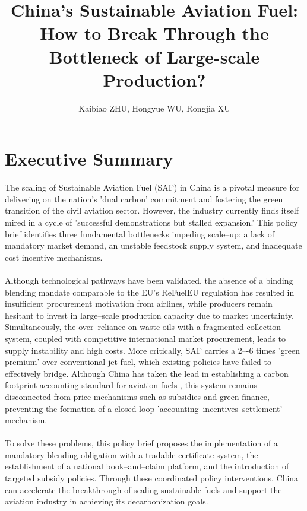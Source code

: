 \documentclass[a4paper,11pt]{article}
\title{\color{schoolblue}\textbf{China's Sustainable Aviation Fuel: How to Break Through the Bottleneck of Large-scale Production?}}
\author{Kaibiao ZHU, Hongyue WU, Rongjia XU}
\date{}
\begin{document}
\maketitle

\section*{Executive Summary}
\begin{tcolorbox}[summarystyle]

The scaling of Sustainable Aviation Fuel (SAF) in China is a pivotal measure for delivering on the nation's 'dual carbon' commitment and fostering the green transition of the civil aviation sector. However, the industry currently finds itself mired in a cycle of 'successful demonstrations but stalled expansion.' This policy brief identifies three fundamental bottlenecks impeding scale--up: a lack of mandatory market demand, an unstable feedstock supply system, and inadequate cost incentive mechanisms.\\
\\
Although technological pathways have been validated, the absence of a binding blending mandate comparable to the EU's ReFuelEU regulation has resulted in insufficient procurement motivation from airlines, while producers remain hesitant to invest in large--scale production capacity due to market uncertainty. Simultaneously, the over--reliance on waste oils with a fragmented collection system, coupled with competitive international market procurement, leads to supply instability and high costs. More critically, SAF carries a 2–-6 times 'green premium' over conventional jet fuel, which existing policies have failed to effectively bridge. Although China has taken the lead in establishing a carbon footprint accounting standard for aviation fuels \cite{caac2025}, this system remains disconnected from price mechanisms such as subsidies and green finance, preventing the formation of a closed-loop 'accounting--incentives--settlement' mechanism.\\
\\
To solve these problems, this policy brief proposes the implementation of a mandatory blending obligation with a tradable certificate system, the establishment of a national book--and--claim platform, and the introduction of targeted subsidy policies. Through these coordinated policy interventions, China can accelerate the breakthrough of scaling sustainable fuels and support the aviation industry in achieving its decarbonization goals.
\end{tcolorbox}
\end{document}
